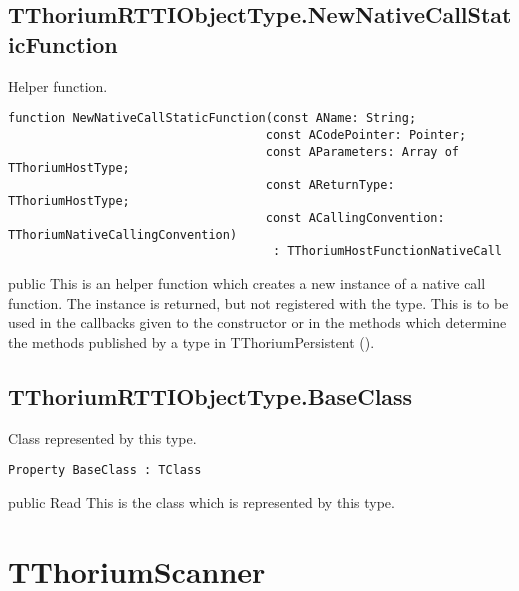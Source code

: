 \subsection{TThoriumRTTIObjectType.NewNativeCallStaticFunction}
\label{thoriumcorepkg:thorium:tthoriumrttiobjecttype:newnativecallstaticfunction}
\begin{FPCList}
\Synopsis
Helper function.\Declaration 

\begin{verbatim}
function NewNativeCallStaticFunction(const AName: String;
                                    const ACodePointer: Pointer;
                                    const AParameters: Array of TThoriumHostType;
                                    const AReturnType: TThoriumHostType;
                                    const ACallingConvention: TThoriumNativeCallingConvention)
                                     : TThoriumHostFunctionNativeCall
\end{verbatim}
\Visibility
public
\Description
This is an helper function which creates a new instance of a native call function. The instance is returned, but not registered with the type. This is to be used in the callbacks given to the constructor or in the methods which determine the methods published by a type in TThoriumPersistent (\pageref{thoriumcorepkg:thorium:tthoriumpersistent}).\end{FPCList}
\subsection{TThoriumRTTIObjectType.BaseClass}
\label{thoriumcorepkg:thorium:tthoriumrttiobjecttype:baseclass}
\begin{FPCList}
\Synopsis
Class represented by this type.\Declaration 

\begin{verbatim}
Property BaseClass : TClass
\end{verbatim}
\Visibility
public
\Access
Read
\Description
This is the class which is represented by this type.\end{FPCList}
\section{TThoriumScanner}
\label{thoriumcorepkg:thorium:tthoriumscanner}

